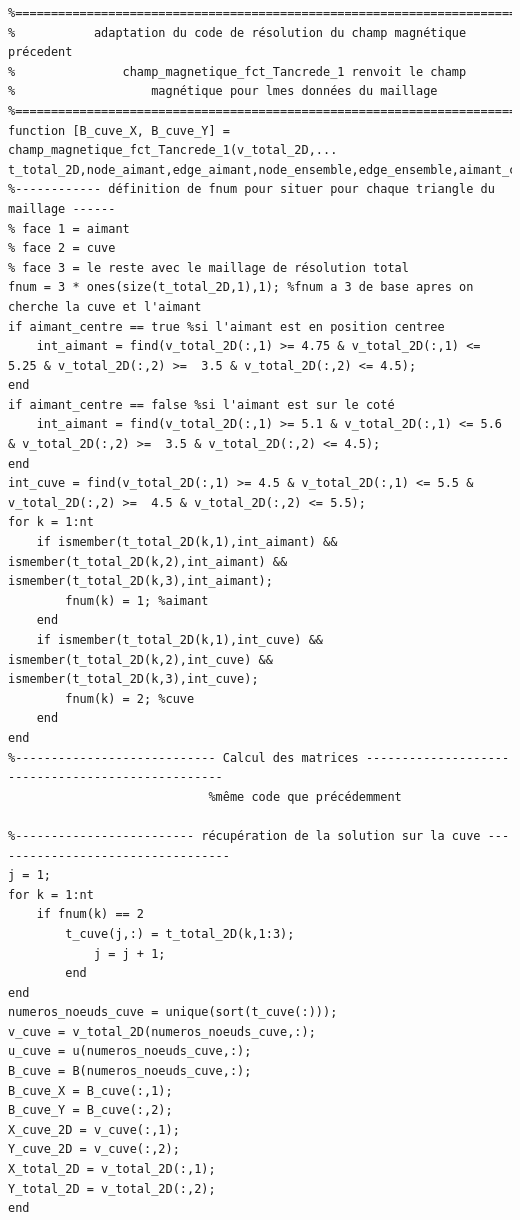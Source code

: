 \documentclass[a4paper,12pt,titlepage]{report}
\begin{document}
\begin{onehalfspace}
\begin{appendix}
\begin{verbatim}
%=================================================================================
% 			adaptation du code de résolution du champ magnétique précedent
%				champ_magnetique_fct_Tancrede_1 renvoit le champ 
%					magnétique pour lmes données du maillage
%==================================================================================
function [B_cuve_X, B_cuve_Y] = champ_magnetique_fct_Tancrede_1(v_total_2D,...
t_total_2D,node_aimant,edge_aimant,node_ensemble,edge_ensemble,aimant_centre)
%------------ définition de fnum pour situer pour chaque triangle du maillage ------
% face 1 = aimant
% face 2 = cuve
% face 3 = le reste avec le maillage de résolution total
fnum = 3 * ones(size(t_total_2D,1),1); %fnum a 3 de base apres on cherche la cuve et l'aimant
if aimant_centre == true %si l'aimant est en position centree
    int_aimant = find(v_total_2D(:,1) >= 4.75 & v_total_2D(:,1) <= 5.25 & v_total_2D(:,2) >=  3.5 & v_total_2D(:,2) <= 4.5);
end
if aimant_centre == false %si l'aimant est sur le coté
    int_aimant = find(v_total_2D(:,1) >= 5.1 & v_total_2D(:,1) <= 5.6 & v_total_2D(:,2) >=  3.5 & v_total_2D(:,2) <= 4.5);
end
int_cuve = find(v_total_2D(:,1) >= 4.5 & v_total_2D(:,1) <= 5.5 & v_total_2D(:,2) >=  4.5 & v_total_2D(:,2) <= 5.5);
for k = 1:nt
	if ismember(t_total_2D(k,1),int_aimant) && ismember(t_total_2D(k,2),int_aimant) && ismember(t_total_2D(k,3),int_aimant);
    	fnum(k) = 1; %aimant
    end
   	if ismember(t_total_2D(k,1),int_cuve) && ismember(t_total_2D(k,2),int_cuve) && ismember(t_total_2D(k,3),int_cuve);
        fnum(k) = 2; %cuve
    end
end
%---------------------------- Calcul des matrices --------------------------------------------------
 							%même code que précédemment 

%------------------------- récupération de la solution sur la cuve ----------------------------------
j = 1;
for k = 1:nt
	if fnum(k) == 2
		t_cuve(j,:) = t_total_2D(k,1:3);
            j = j + 1;
        end
end
numeros_noeuds_cuve = unique(sort(t_cuve(:)));
v_cuve = v_total_2D(numeros_noeuds_cuve,:);
u_cuve = u(numeros_noeuds_cuve,:);
B_cuve = B(numeros_noeuds_cuve,:);
B_cuve_X = B_cuve(:,1);
B_cuve_Y = B_cuve(:,2);
X_cuve_2D = v_cuve(:,1);
Y_cuve_2D = v_cuve(:,2);
X_total_2D = v_total_2D(:,1);
Y_total_2D = v_total_2D(:,2);
end
\end{verbatim}


\end{appendix}
\end{onehalfspace}
\end{document}
